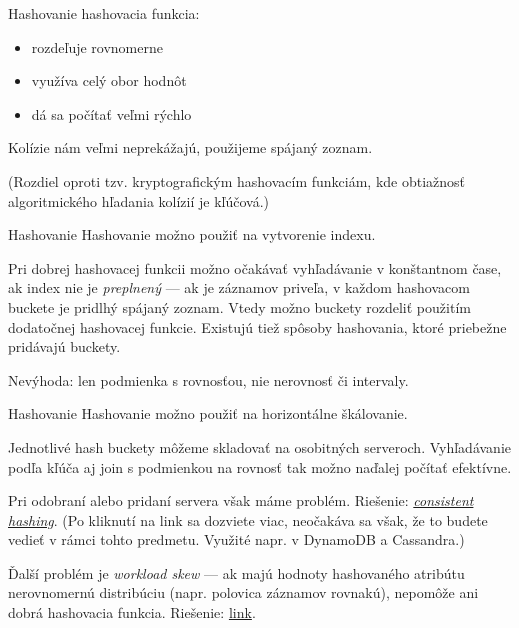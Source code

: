 \documentclass[12pt]{beamer}
\def\blue#1{\textcolor{Cerulean}{#1}}
\begin{document}
\begin{frame}[fragile]{Hashovanie}
 hashovacia funkcia:
\begin{itemize}
\item rozdeľuje rovnomerne
\item využíva celý obor hodnôt
\item dá sa počítať veľmi rýchlo
\end{itemize}
Kolízie nám veľmi neprekážajú, použijeme spájaný zoznam.
\bigskip

(Rozdiel oproti tzv. kryptografickým hashovacím funkciám,
kde obtiažnosť algoritmického hľadania kolízií je kľúčová.)
\end{frame}

\begin{frame}[fragile]{Hashovanie}
Hashovanie možno použiť na vytvorenie indexu.
\bigskip

Pri dobrej hashovacej funkcii možno očakávať vyhľadávanie v konštantnom čase,
ak index nie je \emph{preplnený} --- ak je záznamov priveľa, v každom hashovacom buckete
je pridlhý spájaný zoznam. Vtedy možno buckety rozdeliť použitím dodatočnej hashovacej funkcie.
Existujú tiež spôsoby hashovania, ktoré priebežne pridávajú buckety.
\bigskip

Nevýhoda: len podmienka s rovnosťou, nie nerovnosť či intervaly.
\end{frame}

\begin{frame}[fragile]{Hashovanie}
Hashovanie možno použiť na horizontálne škálovanie.
\bigskip

Jednotlivé hash buckety môžeme skladovať na osobitných serveroch.
Vyhľadávanie podľa kľúča aj join s podmienkou na rovnosť tak možno naďalej počítať efektívne.
\bigskip

Pri odobraní alebo pridaní servera však máme problém. Riešenie:
\blue{\href{https://medium.datadriveninvestor.com/consistent-hashing-an-efficient-scalable-data-distribution-algorithm-a81fc5c0a6c7}{\emph{consistent hashing}}}.
(Po kliknutí na link sa dozviete viac, neočakáva sa však, že to budete vedieť v rámci tohto predmetu. Využité napr. v DynamoDB a Cassandra.)

\bigskip
Ďalší problém je \emph{workload skew} --- ak majú hodnoty hashovaného atribútu nerovnomernú distribúciu (napr. polovica záznamov rovnakú),
nepomôže ani dobrá hashovacia funkcia. Riešenie:
\href{https://scalablehuman.com/2022/06/05/how-to-relieve-hotspots-with-skewed-workloads/}{link}.
\end{frame}
\end{document}
